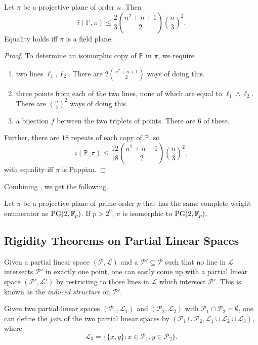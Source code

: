 	\begin{theorem}
		\label{theo: i P pi bound}
		Let $\pi$ be a projective plane of order $n$. Then
		\[ i(\mathbb{P},\pi) \le \frac{2}{3} \binom{n^2+n+1}{2} \binom{n}{3}^2. \]
		Equality holds iff $\pi$ is a field plane.
	\end{theorem}
	\begin{proof}
		To determine an isomorphic copy of $\mathbb{P}$ in $\pi$, we require
		\begin{enumerate}
			\item two lines $\ell_1, \ell_2$. There are $2\binom{n^2+n+1}{2}$ ways of doing this.
			\item three points from each of the two lines, none of which are equal to $\ell_1 \land \ell_2$. There are $\binom{n}{3}^2$ ways of doing this.
			\item a bijection $f$ between the two triplets of points. There are $6$ of these.
		\end{enumerate}
		Further, there are $18$ repeats of each copy of $\mathbb{P}$, so
		\[ i(\mathbb{P},\pi) \le \frac{12}{18} \binom{n^2+n+1}{2} \binom{n}{3}^2, \]
		with equality iff $\pi$ is Pappian.
	\end{proof}

	Combining , we get the following.

	\begin{ftheo}
		Let $\pi$ be a projective plane of prime order $p$ that has the same complete weight enumerator as $\operatorname{PG}(2,\mathbb{F}_p)$. If $p > 2^9$, $\pi$ is isomorphic to $\operatorname{PG}(2,\mathbb{F}_p)$.
	\end{ftheo}

\subsection{Rigidity Theorems on Partial Linear Spaces}

	\begin{fdef}
		Given a partial linear space $(\mathcal{P},\mathcal{L})$ and a $\mathcal{P}' \subseteq \mathcal{P}$ such that no line in $\mathcal{L}$ intersects $\mathcal{P}'$ in exactly one point, one can easily come up with a partial linear space $(\mathcal{P}',\mathcal{L}')$ by restricting to those lines in $\mathcal{L}$ which intersect $\mathcal{P}'$. This is known as the \emph{induced structure} on $\mathcal{P}'$.
	\end{fdef}

	\begin{fdef}[Join]
		Given two partial linear spaces $(\mathcal{P}_1,\mathcal{L}_1)$ and $(\mathcal{P}_2,\mathcal{L}_2)$ with $\mathcal{P}_1 \cap \mathcal{P}_2 = \emptyset$, one can define the \emph{join} of the two partial linear spaces by $(\mathcal{P}_1 \cup \mathcal{P}_2, \mathcal{L}_1\cup\mathcal{L}_2\cup\mathcal{L}_3)$, where
		\[ \mathcal{L}_3 = \{ \{x,y\} : x \in \mathcal{P}_1, y \in \mathcal{P}_2 \}. \]
	\end{fdef}

